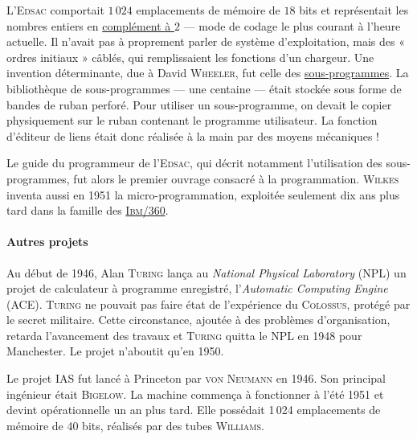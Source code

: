 L’\textsc{Edsac} comportait $1\,024$ emplacements de mémoire de $18$ bits et représentait les nombres entiers en \href{https://fr.wikipedia.org/wiki/Compl\%C3\%A9ment_\%C3\%A0_deux}{complément à $2$} --- mode de codage le plus courant à l’heure actuelle. Il n’avait pas à proprement parler de système d’exploitation, mais des « ordres initiaux » câblés, qui remplissaient les fonctions d’un chargeur. Une invention déterminante, due à David \textsc{Wheeler}, fut celle des \href{https://fr.wikipedia.org/wiki/Sous-programme}{sous-programmes}. La bibliothèque de sous-programmes --- une centaine --- était stockée sous forme de bandes de ruban perforé. Pour utiliser un sous-programme, on devait le copier physiquement sur le ruban contenant le programme utilisateur. La fonction d’éditeur de liens était donc réalisée à la main par des moyens mécaniques !

Le guide du programmeur de l’\textsc{Edsac}, qui décrit notamment l’utilisation des sous-programmes, fut alors le premier ouvrage consacré à la programmation. \textsc{Wilkes} inventa aussi en 1951 la micro-programmation, exploitée seulement dix ans plus tard dans la famille des \href{https://en.wikipedia.org/wiki/IBM_System/360}{\textsc{Ibm/360}}.

\paragraph*{Autres projets}
Au début de 1946, Alan \textsc{Turing} lança au \textit{National Physical Laboratory} (NPL) un projet de calculateur à programme enregistré, l’\textit{Automatic Computing Engine} (ACE). \textsc{Turing} ne pouvait pas faire état de l’expérience du \textsc{Colossus}, protégé par le secret militaire. Cette circonstance, ajoutée à des problèmes d’organisation, retarda l’avancement des travaux et \textsc{Turing} quitta le NPL en 1948 pour Manchester. Le projet n’aboutit qu’en 1950.

Le projet IAS fut lancé à Princeton par \textsc{von Neumann} en 1946. Son principal ingénieur était \textsc{Bigelow}. La machine commença à fonctionner à l’été 1951 et devint opérationnelle un an plus tard. Elle possédait 1\,024 emplacements de mémoire de 40 bits, réalisés par des tubes \textsc{Williams}.

